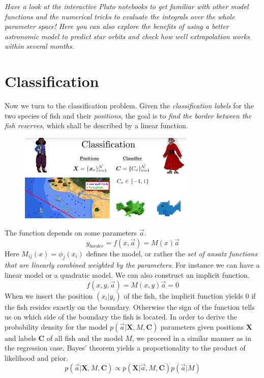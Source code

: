 \documentclass[12pt, a4paper]{scrartcl}
\begin{document}
\textit{Have a look at the interactive Pluto notebooks to get familiar with other
model functions and the numerical tricks to evaluate the integrals over the
whole parameter space! Here you can also explore the benefits of using a better 
astronomic model to predict star orbits and check how well extrapolation
works within several months.}\\

\section*{Classification}
Now we turn to the classification problem.
Given the \textit{classification labels} for the two species of fish and their \textit{positions}, the goal
is to \textit{find the border between the fish reserves}, which shall be described by
a linear function.\\%
\begin{figure}[H]
	\centering
	\includegraphics[width=0.75\textwidth]{7_12.png}
\end{figure}

The function depends on some parameters $\vec{a}$. 
\[y_{border}=f(x,\vec{a})=M(x)\vec{a}\]
Here $M_{ij}(x)=\phi_j(x_i)$ defines the model, or rather
the \textit{set of ansatz functions that are linearly combined weighted by the parameters}. For instance we can have a linear model or a quadratic model. We can also construct an implicit function. \[f(x,y,\vec{a})=M(x,y)\vec{a}=0\]
When we insert the position $(x_i|y_i)$ of the fish, the implicit function yields 0 if the fish resides exactly on the boundary. Otherwise the sign of the function tells us on which side of the boundary the fish is located. 
In order to derive the probability density for the model $p(\vec{a}|\boldsymbol{X},M,\boldsymbol{C})$
parameters given positions $\boldsymbol{X}$ and labels $\boldsymbol{C}$ of all fish and the model $M$, we proceed in a similar manner as in the regression case. Bayes’ theorem yields a proportionality to the product of likelihood and prior.\[p(\vec{a}|\boldsymbol{X},M,\boldsymbol{C})\propto p(\boldsymbol{X}|\vec{a},M,\boldsymbol{C})p(\vec{a}|M)\]
\end{document}
